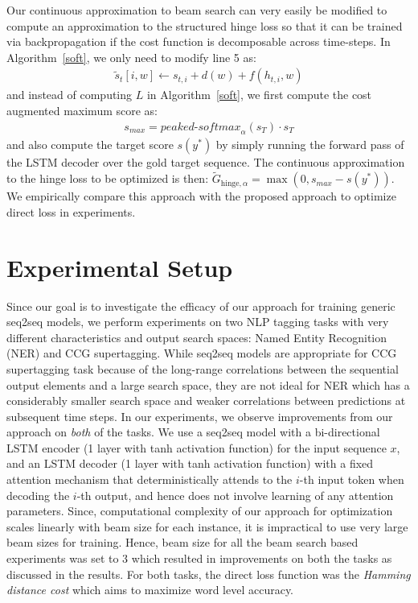 \documentclass[letterpaper]{article} %
\begin{document}
Our continuous approximation to beam search can very easily be modified to compute an approximation to the structured hinge loss so that it can be trained via backpropagation if the cost function is decomposable across time-steps. In Algorithm~\ref{soft}, we only need to modify line 5 as:
\begin{align*}
    \tilde{s}_t[i,w] \gets s_{t,i} + d(w) + f(h_{t,i},w)
\end{align*}
and instead of computing $L$ in Algorithm~\ref{soft}, we first compute the cost augmented maximum score as:
\begin{align*}
  s_{\textit{max}} = \textit{peaked-softmax}_{\alpha}(s_T) \cdot s_{T}
\end{align*}
and also compute the target score $s(y^*)$ by simply running the forward pass of the LSTM decoder over the gold target sequence. The continuous approximation to the hinge loss to be optimized is then: $\tilde{G}_{\textrm{hinge},\alpha} = \max(0,s_{\textit{max}}-s(y^*))$. We empirically compare this approach with the proposed approach to optimize direct loss in experiments.
\section{Experimental Setup}
Since our goal is to investigate the efficacy of our approach for training generic seq2seq models, we perform experiments on two NLP tagging tasks with very different characteristics and output search spaces: Named Entity Recognition (NER) and CCG supertagging. While seq2seq models are appropriate for CCG supertagging task because of the long-range correlations between the sequential output elements and a large search space, they are not ideal for NER which has a considerably smaller search space and weaker correlations between predictions at subsequent time steps. In our experiments, we observe improvements from our approach on \emph{both} of the tasks.  
We use a seq2seq model with a bi-directional LSTM encoder (1 layer with tanh activation function) for the input sequence $x$, and an LSTM decoder (1 layer with tanh activation function) with a fixed attention mechanism that deterministically attends to the $i$-th input token when decoding the $i$-th output, and hence does not involve learning of any attention parameters. Since, computational complexity of our approach for optimization scales linearly with beam size for each instance, it is impractical to use very large beam sizes for training. Hence, beam size for all the beam search based experiments was set to 3 which resulted in improvements on both the tasks as discussed in the results. For both tasks, the direct loss function was the \textit{Hamming distance cost} which aims to maximize word level accuracy.
\end{document}
